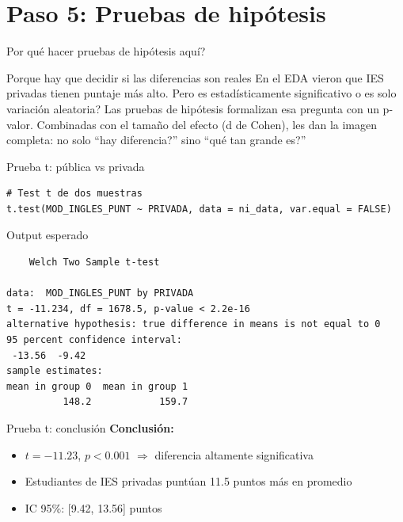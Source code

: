 \documentclass[aspectratio=169, 11pt]{beamer}
\begin{document}
\section{Paso 5: Pruebas de hipótesis}

\begin{frame}{\textquestiondown{}Por qu\'e hacer pruebas de hip\'otesis aqu\'i?}
\begin{exampleblock}{Porque hay que decidir si las diferencias son reales}
\small
En el EDA vieron que IES privadas tienen puntaje m\'as alto. Pero \textquestiondown{}es estad\'isticamente significativo o es solo variaci\'on aleatoria? Las pruebas de hip\'otesis formalizan esa pregunta con un p-valor. Combinadas con el tama\~no del efecto (d de Cohen), les dan la imagen completa: no solo ``\textquestiondown{}hay diferencia?'' sino ``\textquestiondown{}qu\'e tan grande es?''
\end{exampleblock}
\end{frame}

\begin{frame}[fragile]{Prueba t: pública vs privada}
\begin{lstlisting}
# Test t de dos muestras
t.test(MOD_INGLES_PUNT ~ PRIVADA, data = ni_data, var.equal = FALSE)
\end{lstlisting}

\vspace{0.2cm}
\begin{exampleblock}{Output esperado}
\small
\begin{verbatim}
    Welch Two Sample t-test

data:  MOD_INGLES_PUNT by PRIVADA
t = -11.234, df = 1678.5, p-value < 2.2e-16
alternative hypothesis: true difference in means is not equal to 0
95 percent confidence interval:
 -13.56  -9.42
sample estimates:
mean in group 0  mean in group 1
          148.2            159.7
\end{verbatim}
\end{exampleblock}
\end{frame}

\begin{frame}{Prueba t: conclusión}
\textbf{Conclusión:}
\begin{itemize}
\item $t = -11.23$, $p < 0.001$ $\Rightarrow$ diferencia altamente significativa
\item Estudiantes de IES privadas puntúan 11.5 puntos más en promedio
\item IC 95\%: [9.42, 13.56] puntos
\end{itemize}
\end{frame}
\end{document}

